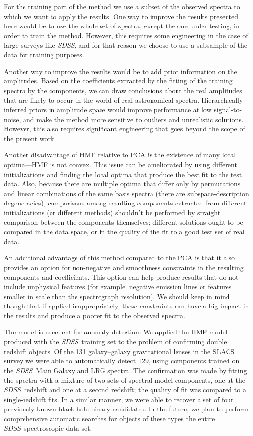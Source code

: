 \documentclass[12pt,preprint]{aastex}
\newcommand{\project}[1]{\textsl{#1}}
\newcommand{\sdss}{\project{SDSS}}
\newcommand{\SDSS}{\sdss}
\begin{document}
For the training part of the method we use a subset of the observed
spectra to which we want to apply the results. One way to improve the
results presented here would be to use the whole set of spectra,
except the one under testing, in order to train the method. However,
this requires some engineering in the case of large surveys like
\SDSS, and for that reason we choose to use a subsample of the data
for training purposes.

Another way to improve the results would be to add prior information
on the amplitudes. Based on the coefficients extracted by the fitting
of the training spectra by the components, we can draw conclusions
about the real amplitudes that are likely to occur in the world of
real astronomical spectra.  Hierarchically inferred priors in
amplitude space would improve performance at low signal-to-noise, and
make the method more sensitive to outliers and unrealistic solutions.
However, this also requires significant engineering that goes beyond
the scope of the present work.

Another disadvantage of HMF relative to PCA is the existence of many
local optima---HMF is not convex.  This issue can be ameliorated by
using different initializations and finding the local optima that
produce the best fit to the test data.  Also, because there are
multiple optima that differ only by permutations and linear
combinations of the same basis spectra (there are subspace-description
degeneracies), comparisons among resulting components extracted from
different initializations (or different methods) shouldn't be performed
by straight comparison between the components themselves; different
solutions ought to be compared in the data space, or in the quality of
the fit to a good test set of real data.

An additional advantage of this method compared to the PCA is that it
also provides an option for non-negative and smoothness constraints in
the resulting components and coefficients.  This option can help
produce results that do not include unphysical features (for example,
negative emission lines or features smaller in scale than the
spectrograph resolution). We should keep in mind though that if
applied inappropriately, these constraints can have a big impact in
the results and produce a poorer fit to the observed spectra.

The model is excellent for anomaly detection:  We applied the HMF
model produced with the \SDSS\ training set to the problem of
confirming double redshift objects.  Of the 131 galaxy--galaxy
gravitational lenses in the SLACS survey we were able to automatically
detect 129, using components trained on the \SDSS\ Main Galaxy and LRG
spectra. The confirmation was made by fitting the spectra with a
mixture of two sets of spectral model components, one at the
\SDSS\ redshift and one at a second redshift; the quality of fit was
compared to a single-redshift fits.  In a similar manner, we were able
to recover a set of four previously known black-hole binary
candidates.  In the future, we plan to perform comprehensive automatic
searches for objects of these types the entire \SDSS\ spectroscopic
data set.
\end{document}

